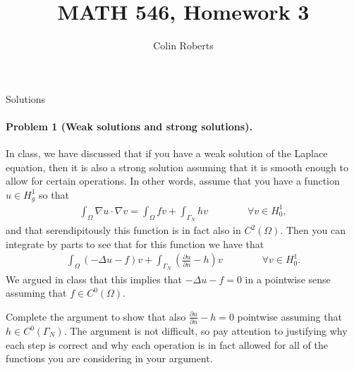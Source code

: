 \documentclass[leqno]{article}
\author{Colin Roberts}
\title{MATH 546, Homework 3}
\theoremstyle{nonumberplain}
\begin{document}
\maketitle
\begin{large}
\begin{center}
Solutions
\end{center}
\end{large}


\paragraph{Problem 1 (Weak solutions and strong solutions).}
In class, we have discussed that if you have a weak solution of the
Laplace equation, then it is also a strong solution assuming that it
is smooth enough to allow for certain operations. In other words,
assume that you have a function $u\in H^1_g$ so that
\begin{align*}
  \int_\Omega \nabla u \cdot \nabla v
  =
  \int_\Omega f v
  +
  \int_{\Gamma_N} h v
  \qquad\qquad \forall v\in H^1_0,
\end{align*}
and that serendipitously this function is in fact also in
$C^2(\Omega)$. Then you can integrate by parts to see that for this
function we have that
\begin{align*}
  \int_\Omega (-\Delta u - f) v
  +
  \int_{\Gamma_N} \left(\frac{\partial u}{\partial n} - h \right) v
  \qquad\qquad \forall v\in H^1_0.
\end{align*}
We argued in class that this implies that $-\Delta u - f=0$ in a
pointwise sense assuming that $f\in C^0(\Omega)$.

Complete the argument to show that also $\frac{\partial u}{\partial n}
- h=0$ pointwise assuming that $h\in C^0(\Gamma_N)$. The argument is
not difficult, so pay attention to 
justifying why each step is correct and why each operation is in fact
allowed for all of the functions you are considering in your argument.
\end{document}
